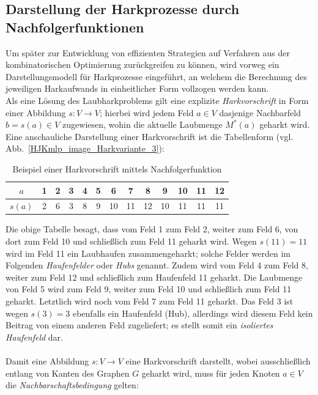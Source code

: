 \documentclass[fontsize=12pt,doubleside,openany,listof=totoc,listof=flat,listof=nochaptergap,numbers=noenddot]{scrbook}
\theoremstyle{style}
\begin{document}
\subsection{Darstellung der Harkprozesse durch Nachfolgerfunktionen}
\label{subsectionNachfolgerfunktion}

\noindent Um später zur Entwicklung von effizienten Strategien auf Verfahren aus der kombinatorischen Optimierung zurückgreifen zu können, wird vorweg ein Darstellungsmodell für Harkprozesse eingeführt, an welchem die Berechnung des jeweiligen Harkaufwands in einheitlicher Form vollzogen werden kann.\\

\noindent Als eine Lösung des Laubharkproblems gilt eine explizite \textit{Harkvorschrift}
in Form einer Abbildung $s:V \rightarrow V$; hierbei wird jedem Feld $a \in V$
dasjenige Nachbarfeld $b=s(a) \in V$ zugewiesen, wohin die aktuelle Laubmenge $M^*(a)$
geharkt wird. Eine anschauliche Darstellung einer Harkvorschrift ist die Tabellenform (vgl. Abb.~\ref{HJKmlp_image_Harkvariante_3}):

\renewcommand{\arraystretch}{1}
\begin{table}[H]
\caption{Beispiel einer Harkvorschrift mittels Nachfolgerfunktion}
\label{HJKmlp_table_Nachfolgerfunktion}
\centering 
\begin{tabular}{|>{}c|>{}c|>{}c|>{}c|>{}c|>{}c|>{}c|>{}c|>{}c|>{}c|>{}c|>{}c|>{}c|}
\hline
$a$ & 1&2 &3 &4 &5 & 6 & 7 & 8 & 9 & 10 & 11 & 12\\
\hline
$s(a)$ & 2 &  6 & 3 & 8 & 9 & 10 & 11 & 12 & 10 & 11 & 11 & 11\\
\hline
\end{tabular}
\end{table}
\renewcommand{\arraystretch}{1}

\noindent Die obige Tabelle besagt, dass vom Feld 1 zum Feld 2, weiter zum Feld 6, 
von dort zum Feld 10 und schließlich zum Feld 11 geharkt wird. Wegen $s(11)=11$
wird im Feld 11 ein Laubhaufen zusammengeharkt; solche Felder werden im
Folgenden \textit{Haufenfelder} oder \textit{Hubs}\label{Hub} genannt. Zudem wird vom
Feld 4 zum Feld 8, weiter zum Feld 12 und schließlich zum Haufenfeld 11 geharkt. Die Laubmenge von Feld 5 wird zum Feld 9, weiter zum Feld 10 und schließlich zum Feld 11 geharkt. Letztlich wird noch vom Feld 7 zum Feld 11 geharkt. Das Feld 3 ist wegen $s(3)=3$ ebenfalls ein Haufenfeld (Hub), allerdings wird diesem Feld kein Beitrag von einem anderen Feld zugeliefert; es stellt somit ein \textit{isoliertes Haufenfeld} dar. 
\\ \\
Damit eine Abbildung $s:V \rightarrow V$ eine Harkvorschrift darstellt, wobei ausschließlich entlang von Kanten des Graphen $G$ geharkt wird, muss für jeden Knoten $a \in V$ die \textit{Nachbarschaftsbedingung} gelten:
\end{document}
